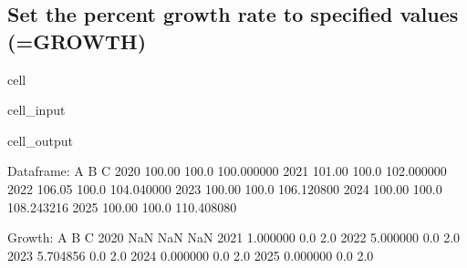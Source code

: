 \documentclass[letterpaper,10pt,english]{jupyterBook}
\begin{document}
\subsection{Set the percent growth rate to specified values (=GROWTH)}
\label{\detokenize{content/howto/update/model update:set-the-percent-growth-rate-to-specified-values-growth}}
\begin{sphinxuseclass}{cell}\begin{sphinxVerbatimInput}

\begin{sphinxuseclass}{cell_input}
\begin{sphinxVerbatim}[commandchars=\\\{\}]
  
 
\end{sphinxVerbatim}

\end{sphinxuseclass}\end{sphinxVerbatimInput}
\begin{sphinxVerbatimOutput}

\begin{sphinxuseclass}{cell_output}
\begin{sphinxVerbatim}[commandchars=\\\{\}]
Dataframe:
           A      B           C
2020  100.00  100.0  100.000000
2021  101.00  100.0  102.000000
2022  106.05  100.0  104.040000
2023  100.00  100.0  106.120800
2024  100.00  100.0  108.243216
2025  100.00  100.0  110.408080

Growth:
             A    B    C
2020       NaN  NaN  NaN
2021  1.000000  0.0  2.0
2022  5.000000  0.0  2.0
2023 \PYGZhy{}5.704856  0.0  2.0
2024  0.000000  0.0  2.0
2025  0.000000  0.0  2.0
\end{sphinxVerbatim}

\end{sphinxuseclass}\end{sphinxVerbatimOutput}

\end{sphinxuseclass}
\end{document}
